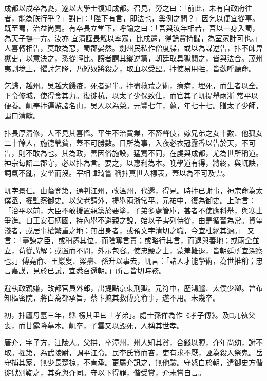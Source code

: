 \begin{pinyinscope}
 成都以戍卒為憂，遂以大學士復知成都。召見，勞之曰：「前此，未有自政府往者，能為朕行乎？」對曰：「陛下有言，即法也，奚例之問？」因乞以便宜從事。既至蜀，治益尚寬。有卒長立堂下，呼諭之曰：「吾與汝年相若，吾以一身入蜀，為天子撫一方。汝亦
 宜清謹畏戢以率眾，比戍還，得餘貲持歸，為室家計可也。」人喜轉相告，莫敢為惡，蜀郡晏然。劍州民私作僧度牒，或以為謀逆告，抃不師畀獄吏，以意決之，悉從輕比。謗者謂其縱逆黨，朝廷取具獄閱之，皆與法合。茂州夷剽境上，懼討乞降，乃縛奴將殺之，取血以受盟。抃使易用牲，皆歡呼聽命。



 乞歸，越州。吳越大饑疫，死者過半。抃盡救荒之術，療病，埋死，而生者以全。下令修城，使得食其力。復徙杭，以太子少保致仕，而官其子屼提舉兩浙
 常平以便養。屼奉抃遍游諸名山，吳人以為榮。元豐七年，薨，年七十七。贈太子少師，謚曰清獻。



 抃長厚清修，人不見其喜慍。平生不治貲業，不畜聲伎，嫁兄弟之女十數、他孤女二十餘人，施德煢貧，蓋不可勝數。日所為事，入夜必衣冠露香以告於天，不可告，則不敢為也。其為政，善因俗施設，猛寬不同，在虔與成都，尤為世所稱道。神宗每詔二郡守，必以抃為言。要之，以惠利為本。晚學道有得，將終，與屼訣，詞氣不亂，安坐而沒。宰相韓琦嘗
 稱抃真世人標表，蓋以為不可及雲。



 屼字景仁。由蔭登第，通判江州，改溫州，代還，得見。時抃已謝事，神宗命為太僕丞，擢監察御史。以父老請外，提舉兩浙常平。元祐中，復為御史。上疏言：「治平以前，大臣不敢援置親黨於要塗，子弟多處管庫，甚者不使應科舉，與寒士爭進。自王安石柄國，持內舉不避親之說，始以子雱列侍從，由是循習為常。資望淺者，或居事權繁重之地；無出身者，或預文字清切之職，今宜杜絕其源。」
 又言：「臺諫之臣，或稍遷其位，而陰奪言責；或略行其言，而退與善地；或兩全並立，茍從講解；或置而不問，外示包容。使忠鯁之士，蒙羞難退，皆朝廷所宜深察也。」傅堯俞、王巖叟、梁燾、孫升以事去，屼言：「諸人才能學術，為世推稱；忠言嘉謨，見於已試，宜悉召還朝。」所言皆切時務。



 避執政親嫌，改都官員外郎，出提點京東刑獄。元符中，歷鴻臚、太僕少卿。曾布知樞密院，將白為都承旨，蔡卞摭其救傅堯俞事，遂不用。未幾卒。



 初，抃廬母墓三年，縣
 榜其里曰「孝弟」。處士孫侔為作《孝子傳》。及□兀執父喪，而甘露降墓木。屼卒，子雲又以毀死，人稱其世孝。



 唐介，字子方，江陵人。父拱，卒漳州，州人知其貧，合錢以賻，介年尚幼，謝不取。擢第，為武陵尉，調平江令。民李氏貲而吝，吏有求不厭，誣為殺人祭鬼。岳守捕其家，無少長楚掠，不肯承。更屬介訊之，無他驗。守怒白於朝，遣御史方偕徙獄別鞫之，其究與介同。守以下得罪，偕受賞，介未嘗自言。




\end{pinyinscope}
